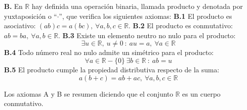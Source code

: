 \vspace{1.3cm}
\textbf{B.}\label{Axioma_B} En $\mathbb{R}$ hay definida una operación binaria, llamada producto y denotada por yuxtaposición o ``$\cdot$'', que verifica los siguientes axiomas:
\newline
\newline
\hspace*{1cm} \textbf{B.1} El producto es asociativo: $(ab)c=a(bc), ~\forall a,b,c \in \mathbb{R}$.
\newline
\newline
\hspace*{1cm} \textbf{B.2} El producto es conmutativo: $ab=ba, ~\forall a,b \in \mathbb{R}$.
\newline
\hspace*{1cm} \textbf{B.3} Existe un elemento neutro no nulo para el producto:
\begin{equation*}
    \exists u \in \mathbb{R}, ~u \neq 0 ~:~au=a,~ \forall a \in \mathbb{R}
\end{equation*}
\hspace*{1cm} \textbf{B.4} Todo número real no nulo admite un simétrico para el producto:
\begin{equation*}
    \forall a \in \mathbb{R}-\{0\}~ \exists b \in \mathbb{R} ~:~ab=u
\end{equation*}
\hspace*{1cm} \textbf{B.5} El producto cumple la propiedad distributiva respecto  de la suma:
\begin{equation*}
    a(b+c)=ab+ac, ~\forall a,b,c \in \mathbb{R}
\end{equation*}

Los axiomas A y B se resumen diciendo que el conjunto $\mathbb{R}$ es un cuerpo conmutativo.\\

